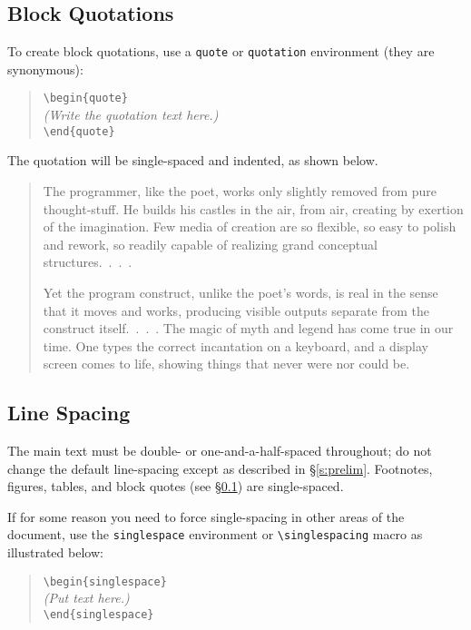 \documentclass[doublespacing]{utdthesis}
\let\cite=\citep
\newenvironment{exampleclasscode}
 {\parindent=1cm\begin{verse}}
 {\end{verse}}
\begin{document}
\subsection{Block Quotations}
\label{s:quotes}

To create block quotations, use a \texttt{quote} or \texttt{quotation}
environment (they are synonymous):
\begin{exampleclasscode}
\verb|\begin{quote}| \\
\textit{(Write the quotation text here.)} \\
\verb|\end{quote}|
\end{exampleclasscode}
The quotation will be single-spaced and indented, as shown below.
\begin{quote}
The programmer, like the poet, works only slightly removed from pure
thought-stuff.
He builds his castles in the air, from air, creating by exertion of the
imagination.
Few media of creation are so flexible, so easy to polish and rework, so
readily capable of realizing grand conceptual structures.~.~.~.

Yet the program construct, unlike the poet's words, is real in the sense that
it moves and works, producing visible outputs separate from the construct
itself.~.~.~.
The magic of myth and legend has come true in our time.
One types the correct incantation on a keyboard, and a display screen comes to
life, showing things that never were nor could be.~\cite{brooks}
\end{quote}

\subsection{Line Spacing}
\label{s:spacing}

The main text must be double- or one-and-a-half-spaced throughout; do not
change the default line-spacing except as described in \S\ref{s:prelim}.
Footnotes, figures, tables, and block quotes (see \S\ref{s:quotes}) are
single-spaced.

If for some reason you need to force single-spacing in other areas of the
document, use the \verb|singlespace| environment or \verb|\singlespacing| macro
as illustrated below:

\begin{exampleclasscode}
\verb|\begin{singlespace}| \\
\textit{(Put text here.)} \\
\verb|\end{singlespace}|
\end{exampleclasscode}
\end{document}
